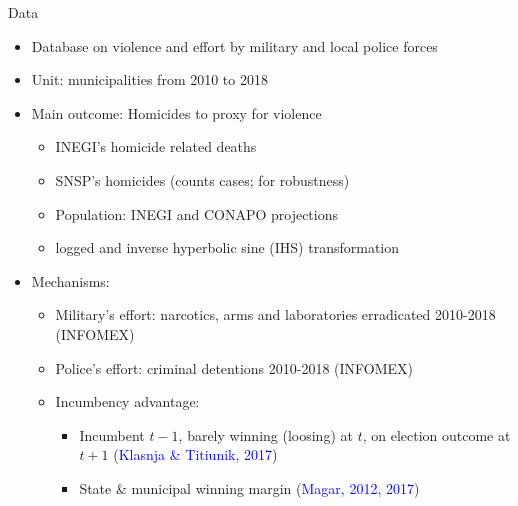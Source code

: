 \documentclass{beamer}
\begin{document}
\begin{frame}[label=data]{Data}
 
 \begin{itemize}
 		  \setlength\itemsep{1em}
	
 	\item  Database on violence and effort by military and local police forces
 	\item Unit: municipalities from 2010 to 2018
 	\item Main outcome: Homicides to proxy for violence
 		\begin{itemize} 
 		\item INEGI's homicide related deaths
 		\item SNSP's homicides (counts cases; for robustness)
 		\item Population: INEGI and CONAPO projections
 		\item logged and inverse hyperbolic sine (IHS) transformation %
 		\end{itemize}
 		
 	\item Mechanisms: 
 		\begin{itemize} 
 		\item Military's effort: narcotics, arms and laboratories erradicated 2010-2018 (INFOMEX)
 		\item Police's effort: criminal detentions 2010-2018 (INFOMEX)
 		\item Incumbency advantage: 
 			\begin{itemize} 
 			\item Incumbent $t-1$, barely winning (loosing) at $t$, on election outcome at $t+1$ (\textcolor{blue}{Klasnja \& Titiunik, 2017})
 			\item State \& municipal winning margin (\textcolor{blue}{Magar, 2012, 2017})

 		 	\end{itemize}

 		\end{itemize}
 \end{itemize}


\end{frame} 
\end{document}
